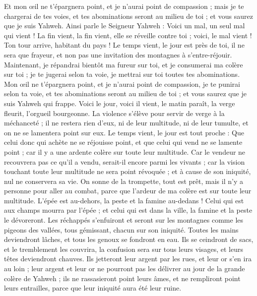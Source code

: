 \begin{multicols}{2}
Et mon œil ne t'épargnera point, et je n'aurai point de compassion ; mais je te chargerai de tes voies, et tes abominations seront au milieu de toi ; et vous saurez que je suis Yahweh.
Ainsi parle le Seigneur Yahweh : Voici un mal, un seul mal qui vient !
La fin vient, la fin vient, elle se réveille contre toi ; voici, le mal vient !
Ton tour arrive, habitant du pays ! Le temps vient, le jour est près de toi, il ne sera que frayeur, et non pas une invitation des montagnes à s'entre-réjouir.
Maintenant, je répandrai bientôt ma fureur sur toi, et je consumerai ma colère sur toi ; je te jugerai selon ta voie, je mettrai sur toi toutes tes abominations.
Mon œil ne t'épargnera point, et je n'aurai point de compassion, je te punirai selon ta voie, et tes abominations seront au milieu de toi ; et vous saurez que je suis Yahweh qui frappe.
Voici le jour, voici il vient, le matin paraît, la verge fleurit, l'orgueil bourgeonne.
La violence s'élève pour servir de verge à la méchanceté ; il ne restera rien d'eux, ni de leur multitude, ni de leur tumulte, et on ne se lamentera point sur eux.
Le temps vient, le jour est tout proche : Que celui donc qui achète ne se réjouisse point, et que celui qui vend ne se lamente point ; car il y a une ardente colère sur toute leur multitude.
Car le vendeur ne recouvrera pas ce qu'il a vendu, serait-il encore parmi les vivants ; car la vision touchant toute leur multitude ne sera point révoquée ; et à cause de son iniquité, nul ne conservera sa vie.
On sonne de la trompette, tout est prêt, mais il n'y a personne pour aller au combat, parce que l'ardeur de ma colère est sur toute leur multitude.
L'épée est au-dehors, la peste et la famine au-dedans ! Celui qui est aux champs mourra par l'épée ; et celui qui est dans la ville, la famine et la peste le dévoreront.
Les réchappés s'enfuiront et seront sur les montagnes comme les pigeons des vallées, tous gémissant, chacun sur son iniquité.
Toutes les mains deviendront lâches, et tous les genoux se fondront en eau.
Ils se ceindront de sacs, et le tremblement les couvrira, la confusion sera sur tous leurs visages, et leurs têtes deviendront chauves.
Ils jetteront leur argent par les rues, et leur or s'en ira au loin ; leur argent et leur or ne pourront pas les délivrer au jour de la grande colère de Yahweh ; ils ne rassasieront point leurs âmes, et ne rempliront point leurs entrailles, parce que leur iniquité aura été leur ruine.

\end{multicols}
